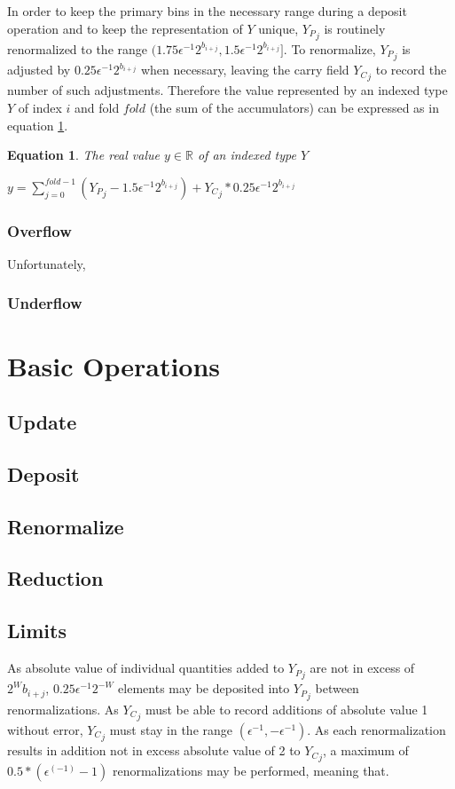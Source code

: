 \documentclass[12pt]{article}
\providecommand{\R}{\ensuremath{\mathbb{R}}}
\theoremstyle{plain}
\newtheorem{eq}{Equation}[section]
\begin{document}
      In order to keep the primary bins in the necessary range during a deposit operation and to keep the representation of $Y$ unique, ${Y_P}_j$ is routinely renormalized to the range $(1.75 \epsilon^{-1} 2^{b_{i + j}}, 1.5 \epsilon^{-1} 2^{b_{i + j}}]$.
      To renormalize, ${Y_P}_j$ is adjusted by $0.25 \epsilon^{-1} 2^{b_{i + j}}$ when necessary, leaving the carry field ${Y_C}_j$ to record the number of such adjustments. Therefore the value represented by an indexed type $Y$ of index $i$ and fold $fold$ (the sum of the accumulators) can be expressed as in equation \ref{eq:indexedvalue}.
      \begin{eq} The real value $y \in \R$ of an indexed type $Y$

        $y = \sum\limits_{j = 0}^{fold - 1} ({Y_P}_j - 1.5 \epsilon^{-1}2^{b_{i + j}}) + {Y_C}_j * 0.25\epsilon^{-1}2^{b_{i + j}}$
        \label{eq:indexedvalue}
      \end{eq}
    \subsubsection{Overflow}
      \label{sec:overflow}
      Unfortunately, 
    \subsubsection{Underflow}

\section{Basic Operations}
  \subsection{Update}
  \subsection{Deposit}
  \subsection{Renormalize}
  \subsection{Reduction}
  \subsection{Limits}
    \label{sec:limits}
    As absolute value of individual quantities added to ${Y_P}_j$ are not in excess of $2^W b_{i + j}$, $0.25\epsilon^{-1}2^{-W}$ elements may be deposited into ${Y_P}_j$ between renormalizations. As ${Y_C}_j$ must be able to record additions of absolute value 1 without error, ${Y_C}_j$ must stay in the range $(\epsilon^{-1}, -\epsilon^{-1})$. As each renormalization results in addition not in excess absolute value of 2 to ${Y_C}_j$, a maximum of $0.5 * (\epsilon^(-1) - 1)$ renormalizations may be performed, meaning that.
\end{document}
